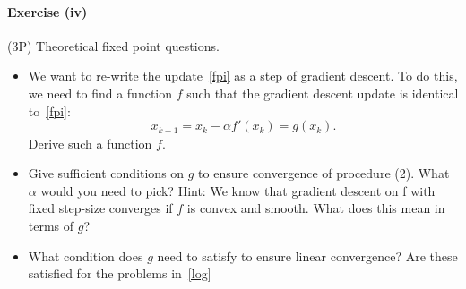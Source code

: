 \documentclass{scrartcl}
\theoremstyle{definition}
\begin{document}
\paragraph{Exercise (iv)} (3P) Theoretical fixed point questions.
\begin{itemize}
  \item We want to re-write the update~\eqref{fpi} as a step of gradient descent. To do this, we need to find a function $f$
        such that the gradient descent update is identical to~\eqref{fpi}:
        \begin{equation}
          x_{k+1} = x_k - \alpha f′(x_k) = g(x_k) .
        \end{equation}
        Derive such a function $f$.
  \item Give sufficient conditions on $g$ to ensure convergence of procedure (2). What $\alpha$ would you need to pick?
        Hint: We know that gradient descent on f with fixed step-size converges if $f$ is convex and smooth. What
        does this mean in terms of $g$?
  \item What condition does $g$ need to satisfy to ensure linear convergence? Are these satisfied for the problems in~\eqref{log}
\end{itemize}
\end{document}
